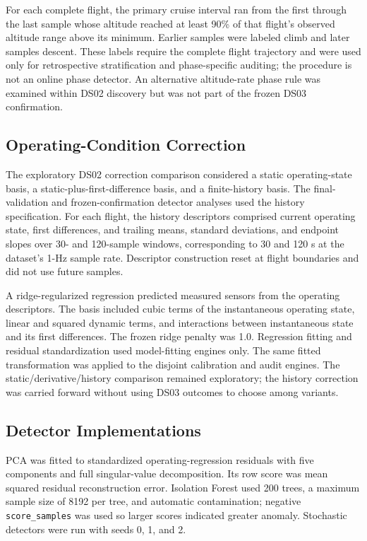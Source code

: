 \documentclass[preprint,12pt]{elsarticle}
\begin{document}
For each complete flight, the primary cruise interval ran from the first through the last sample whose altitude reached at least 90\% of that flight's observed altitude range above its minimum. Earlier samples were labeled climb and later samples descent. These labels require the complete flight trajectory and were used only for retrospective stratification and phase-specific auditing; the procedure is not an online phase detector. An alternative altitude-rate phase rule was examined within DS02 discovery but was not part of the frozen DS03 confirmation.

\subsection{Operating-Condition Correction}\label{operating-condition-correction}

The exploratory DS02 correction comparison considered a static operating-state basis, a static-plus-first-difference basis, and a finite-history basis. The final-validation and frozen-confirmation detector analyses used the history specification. For each flight, the history descriptors comprised current operating state, first differences, and trailing means, standard deviations, and endpoint slopes over 30- and 120-sample windows, corresponding to 30 and 120 s at the dataset's 1-Hz sample rate. Descriptor construction reset at flight boundaries and did not use future samples.

A ridge-regularized regression predicted measured sensors from the operating descriptors. The basis included cubic terms of the instantaneous operating state, linear and squared dynamic terms, and interactions between instantaneous state and its first differences. The frozen ridge penalty was 1.0. Regression fitting and residual standardization used model-fitting engines only. The same fitted transformation was applied to the disjoint calibration and audit engines. The static/derivative/history comparison remained exploratory; the history correction was carried forward without using DS03 outcomes to choose among variants.

\subsection{Detector Implementations}\label{detector-implementations}

PCA was fitted to standardized operating-regression residuals with five components and full singular-value decomposition. Its row score was mean squared residual reconstruction error. Isolation Forest used 200 trees, a maximum sample size of 8192 per tree, and automatic contamination; negative \texttt{score\_samples} was used so larger scores indicated greater anomaly. Stochastic detectors were run with seeds 0, 1, and 2.
\end{document}
